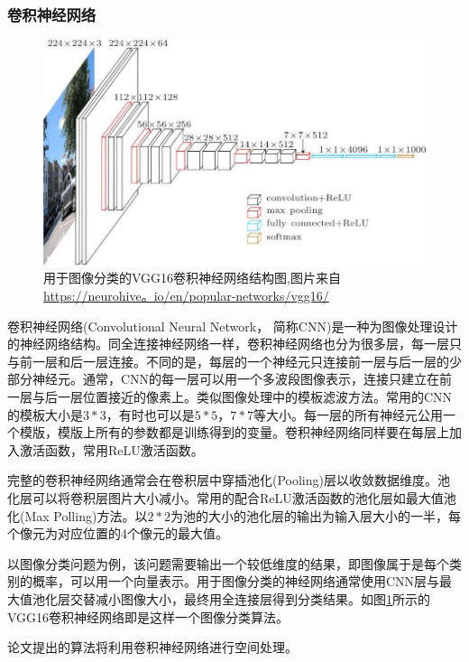 \subsubsection{卷积神经网络}  \label{section:cnn}
\par
\begin{figure}[htbp!]
    \centering
    \includegraphics[width = 1.\textwidth]{chap/img/vgg16-neural-network.jpg}
    \caption{
        用于图像分类的VGG16\supercite{simonyan2014very}卷积神经网络结构图,图片来自\url{https://neurohive。io/en/popular-networks/vgg16/}
        }\label{fig:vgg16_architecture}
\end{figure}
\par
卷积神经网络(Convolutional Neural Network， 简称CNN)是一种为图像处理设计的神经网络结构。同全连接神经网络一样，卷积神经网络也分为很多层，每一层只与前一层和后一层连接。不同的是，每层的一个神经元只连接前一层与后一层的少部分神经元。通常，CNN的每一层可以用一个多波段图像表示，连接只建立在前一层与后一层位置接近的像素上。类似图像处理中的模板滤波方法。常用的CNN的模板大小是$3*3$，有时也可以是$5*5$，$7*7$等大小。每一层的所有神经元公用一个模版，模版上所有的参数都是训练得到的变量。卷积神经网络同样要在每层上加入激活函数，常用ReLU激活函数。
\par
完整的卷积神经网络通常会在卷积层中穿插池化(Pooling)层以收敛数据维度。池化层可以将卷积层图片大小减小。常用的配合ReLU激活函数的池化层如最大值池化(Max Polling)方法。以$2*2$为池的大小的池化层的输出为输入层大小的一半，每个像元为对应位置的4个像元的最大值。
\par
以图像分类问题为例，该问题需要输出一个较低维度的结果，即图像属于是每个类别的概率，可以用一个向量表示。用于图像分类的神经网络通常使用CNN层与最大值池化层交替减小图像大小，最终用全连接层得到分类结果。如图\ref{fig:vgg16_architecture}所示的VGG16\supercite{simonyan2014very}卷积神经网络即是这样一个图像分类算法。
\par
论文提出的算法将利用卷积神经网络进行空间处理。
\par
